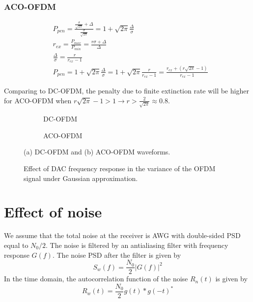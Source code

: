 \documentclass[a4paper]{article}
\begin{document}
\subsubsection{ACO-OFDM}
\begin{align} \nonumber
& P_{pen} = \frac{\frac{\sigma}{\sqrt{2\pi}} + \Delta}{\frac{\sigma}{\sqrt{2\pi}}} = 1 + \sqrt{2\pi}\frac{\Delta}{\sigma} \\
&r_{ex} = \frac{P_{max}}{P_{min}} = \frac{r\sigma + \Delta}{\Delta} \\ \nonumber
&\frac{\Delta}{\sigma} = \frac{r}{r_{ex}-1} \\ 
& P_{pen} = 1 + \sqrt{2\pi}\frac{\Delta}{\sigma} = 1 + \sqrt{2\pi}\frac{r}{r_{ex}-1} = \frac{r_{ex} + (r\sqrt{2\pi} - 1)}{r_{ex} - 1}
\end{align}

Comparing to DC-OFDM, the penalty due to finite extinction rate will be higher for ACO-OFDM when $r\sqrt{2\pi}-1 > 1 \to r > \frac{2}{\sqrt{2\pi}} \approx 0.8$.

\FloatBarrier
\begin{figure}[h!]
	\centering
	\begin{subfigure}[h!]{\textwidth}
		\centering
		\resizebox{\linewidth}{!}{}
		\caption{DC-OFDM}
	\end{subfigure}%

	\begin{subfigure}[h!]{\textwidth}
		\centering
		\resizebox{\linewidth}{!}{}
		\caption{ACO-OFDM}
	\end{subfigure}
	\caption{(a) DC-OFDM and (b) ACO-OFDM waveforms.}
\end{figure}
\FloatBarrier


\FloatBarrier
\begin{figure}[h!]
	\centering
	\resizebox{\linewidth}{!}{}
	\caption{Effect of DAC frequency response in the variance of the OFDM signal under Gaussian approximation.}
\end{figure}
\FloatBarrier

\section{Effect of noise}

We assume that the total noise at the receiver is AWG with double-sided PSD equal to $N_0/2$. The noise is filtered by an antialiasing filter with frequency response $G(f)$. The noise PSD after the filter is given by
\begin{equation}
S_w(f) = \frac{N_0}{2}|G(f)|^2
\end{equation}
In the time domain, the autocorrelation function of the noise $R_n(t)$ is given by
\begin{equation}
R_w(t) = \frac{N_0}{2}g(t)*g(-t)^*
\end{equation}
\end{document}
